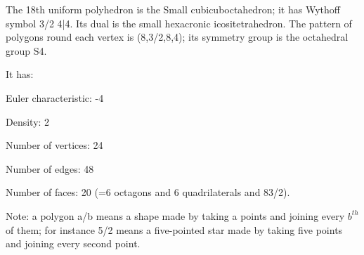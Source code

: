 The 18th uniform polyhedron is the Small cubicuboctahedron; it has Wythoff symbol 3/2 4|4. Its dual is the small hexacronic icositetrahedron. The pattern of polygons round each vertex is (8,3/2,8,4); its symmetry group is the octahedral group S4.\par
It has:\par
Euler characteristic: -4\par
Density: 2\par
Number of vertices: 24\par
Number of edges:  48\par
Number of faces: 20 (=6 octagons and 6 quadrilaterals and 8{3/2}).\par
Note: a polygon a/b means a shape made by taking a points and joining every $b^{th}$  of them; for instance 5/2 means a five-pointed star made by taking five points and joining every second point.